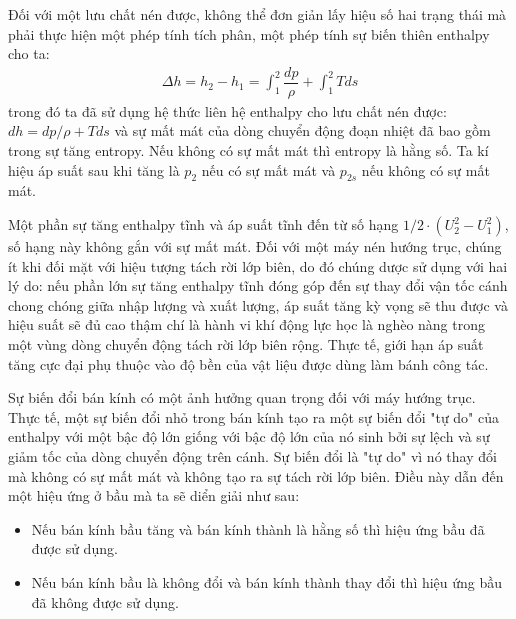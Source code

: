 \documentclass[MAY_THUY_KHI.tex]{subfiles}
\begin{document}
        Đối với một lưu chất nén được, không thể đơn giản lấy hiệu số hai trạng thái mà phải thực hiện một phép tính tích phân, một phép tính sự biến thiên enthalpy cho ta:
            \begin{align}
                \Delta h=h_2-h_1=\int_1^2\dfrac{dp}{\rho}+\int_1^2Tds
            \end{align}
        trong đó ta đã sử dụng hệ thức liên hệ enthalpy cho lưu chất nén được: $dh=dp/\rho+Tds$ và sự mất mát của dòng chuyển động đoạn nhiệt đã bao gồm trong sự tăng entropy. Nếu không có sự mất mát thì entropy là hằng số. Ta kí hiệu áp suất sau khi tăng là $p_2$ nếu có sự mất mát và $p_{2s}$ nếu không có sự mất mát.

        Một phần sự tăng enthalpy tĩnh và áp suất tĩnh đến từ số hạng $1/2\cdot\left(U_2^2-U_1^2\right)$, số hạng này không gắn với sự mất mát. Đối với một máy nén hướng trục, chúng ít khi đối mặt với hiệu tượng tách rời lớp biên, do đó chúng dược sử dụng với hai lý do: nếu phần lớn sự tăng enthalpy tĩnh đóng góp đến sự thay đổi vận tốc cánh chong chóng giữa nhập lượng và xuất lượng, áp suất tăng kỳ vọng sẽ thu được và hiệu suất sẽ đủ cao thậm chí là hành vi khí động lực học là nghèo nàng trong một vùng dòng chuyển động tách rời lớp biên rộng. Thực tế, giới hạn áp suất tăng cực đại phụ thuộc vào độ bền của vật liệu được dùng làm bánh công tác.

        Sự biến đổi bán kính có một ảnh hưởng quan trọng đối với máy hướng trục. Thực tế, một sự biến đổi nhỏ trong bán kính tạo ra một sự biến đổi "tự do" của enthalpy với một bậc độ lớn giống với bậc độ lớn của nó sinh bởi sự lệch và sự giảm tốc của dòng chuyển động trên cánh. Sự biến đổi là "tự do" vì nó thay đổi mà không có sự mất mát và không tạo ra sự tách rời lớp biên. Điều này dẫn đến một hiệu ứng ở bầu mà ta sẽ diển giải như sau:
        \begin{itemize}
            \item Nếu bán kính bầu tăng và bán kính thành là hằng số thì hiệu ứng bầu đã được sử dụng.
            \item Nếu bán kính bầu là không đổi và bán kính thành thay đổi thì hiệu ứng bầu đã không được sử dụng.
        \end{itemize}
\end{document}
